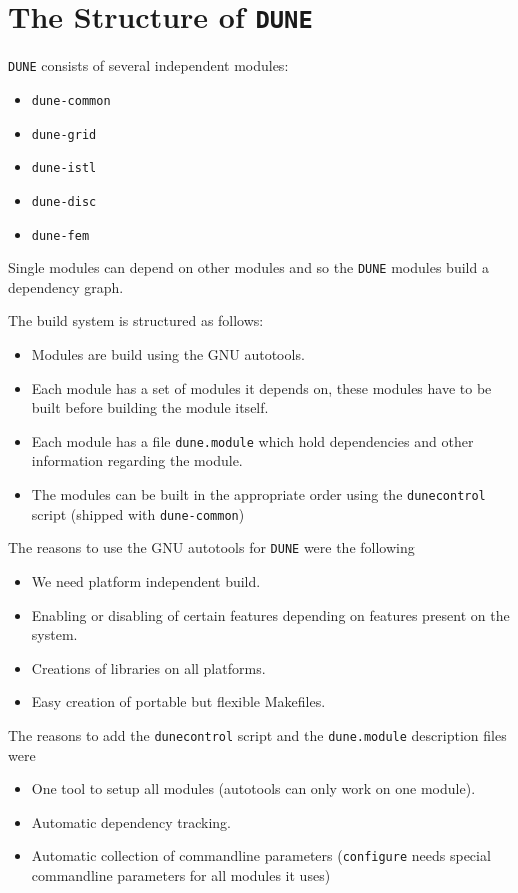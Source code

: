 \documentclass[11pt,a4paper,headinclude,footinclude,DIV16,normalheadings]{scrartcl}
\newcommand{\dune}{\texttt{DUNE}\xspace}
\newcommand{\configure}{\texttt{configure}\xspace}
\newcommand{\dunecommon}{\texttt{dune-common}\xspace}
\newcommand{\duneistl}{\texttt{dune-istl}\xspace}
\newcommand{\dunegrid}{\texttt{dune-grid}\xspace}
\newcommand{\dunefem}{\texttt{dune-fem}\xspace}
\newcommand{\dunedisc}{\texttt{dune-disc}\xspace}
\newcommand{\dunecontrol}{\texttt{dunecontrol}\xspace}
\newcommand{\dunemodule}{\texttt{dune.module}\xspace}
\begin{document}
\section{The Structure of \dune}
\dune consists of several independent modules:
\begin{itemize}
\item \dunecommon
\item \dunegrid
\item \duneistl
\item \dunedisc
\item \dunefem
\end{itemize}

Single modules can depend on other modules and so the \dune modules
build a dependency graph.

The build system is structured as follows:
\begin{itemize}
\item Modules are build using the GNU autotools.
\item Each module has a set of modules it depends on, these modules
  have to be built before building the module itself.
\item Each module has a file \dunemodule which hold dependencies and
  other information regarding the module.
\item The modules can be built in the appropriate order using the
  \dunecontrol script (shipped with \dunecommon)
\end{itemize}

The reasons to use the GNU autotools for \dune were the following
\begin{itemize}
\item We need platform independent build.
\item Enabling or disabling of certain features depending on
  features present on the system.
\item Creations of libraries on all platforms.
\item Easy creation of portable but flexible Makefiles.
\end{itemize}

The reasons to add the \dunecontrol script and the \dunemodule
description files were
\begin{itemize}
\item One tool to setup all modules (autotools can only work on one
  module).
\item Automatic dependency tracking.
\item Automatic collection of commandline parameters (\configure needs
  special commandline parameters for all modules it uses)
\end{itemize}
\end{document}
